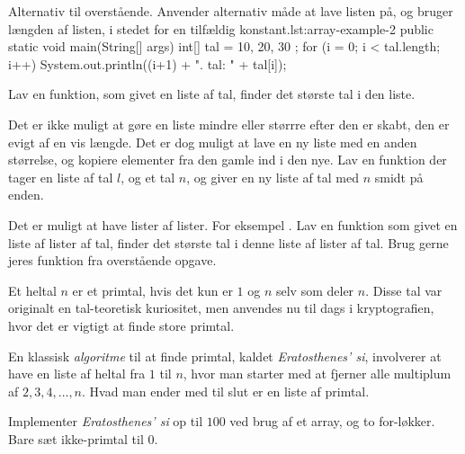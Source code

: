     \begin{JavaCode}{Alternativ til overstående. Anvender alternativ måde at lave listen på, og bruger længden af listen, i stedet for en tilfældig konstant.}{lst:array-example-2}
        public static void main(String[] args) {
            int[] tal = { 10, 20, 30 };
            for (i = 0; i < tal.length; i++) {
                System.out.println((i+1) + ". tal: "
                                         + tal[i]);
            }
        }
    \end{JavaCode}


	\begin{exercise}
		Lav en funktion, som givet en liste af tal, finder det største tal i den
		liste.
	\end{exercise}

    \begin{exercise}
        Det er ikke muligt at gøre en liste mindre eller størrre efter
        den er skabt, den er evigt af en vis længde.  Det er dog
        muligt at lave en ny liste med en anden størrelse, og kopiere
        elementer fra den gamle ind i den nye.
        Lav en funktion  der tager en liste af tal
        \(l\), og et tal \(n\), og giver en ny liste af tal med \(n\)
        smidt på enden.
    \end{exercise}

    \begin{exercise}
        Det er muligt at have lister af lister. For eksempel
        .  Lav en funktion som givet en liste af
        lister af tal, finder det største tal i denne liste af lister
        af tal. Brug gerne jeres funktion fra overstående opgave.
    \end{exercise}

	\begin{exercise}
		Et heltal \(n\) er et primtal, hvis det kun er \(1\) og \(n\) selv som
		deler \(n\). Disse tal var originalt en tal-teoretisk kuriositet, men
		anvendes nu til dags i kryptografien, hvor det er vigtigt at finde store
		primtal.

		En klassisk \emph{algoritme} til at finde primtal, kaldet
		\emph{Eratosthenes' si}, involverer at have en liste af heltal fra \(1\)
		til \(n\), hvor man starter med at fjerner alle multiplum af
		\(2, 3, 4, \dots, n\). Hvad man ender med til slut er en liste af primtal.

		Implementer \emph{Eratosthenes' si} op til \(100\) ved brug af et
		array, og to for-løkker. Bare sæt ikke-primtal til \(0\).
	\end{exercise}

